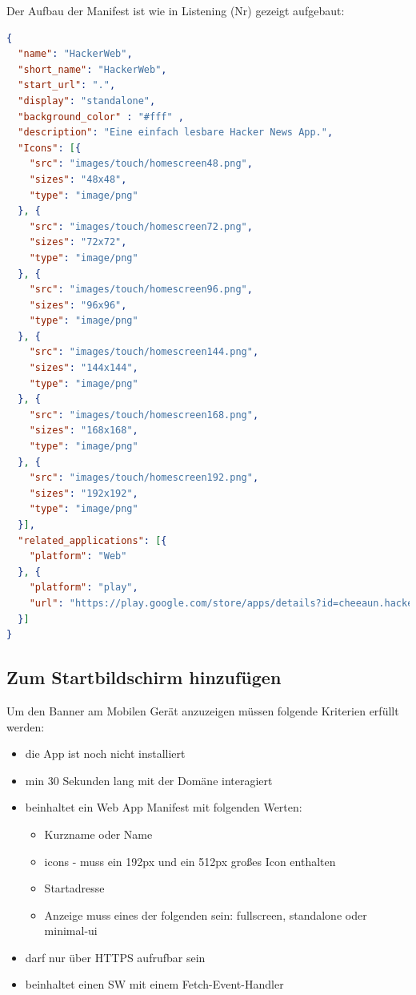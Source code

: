 \newpage
Der Aufbau der Manifest ist wie in Listening (Nr) gezeigt aufgebaut:
\begin{lstlisting}[language=json, firstnumber=1, caption={Manifest in das Projekt implementieren},label=lst:Manifest.json, xleftmargin=50pt]
{
  "name": "HackerWeb",
  "short_name": "HackerWeb",
  "start_url": ".",
  "display": "standalone",
  "background_color" : "#fff" ,
  "description": "Eine einfach lesbare Hacker News App.",
  "Icons": [{
    "src": "images/touch/homescreen48.png",
    "sizes": "48x48",
    "type": "image/png"
  }, {
    "src": "images/touch/homescreen72.png",
    "sizes": "72x72",
    "type": "image/png"
  }, {
    "src": "images/touch/homescreen96.png",
    "sizes": "96x96",
    "type": "image/png"
  }, {
    "src": "images/touch/homescreen144.png",
    "sizes": "144x144",
    "type": "image/png"
  }, {
    "src": "images/touch/homescreen168.png",
    "sizes": "168x168",
    "type": "image/png"
  }, {
    "src": "images/touch/homescreen192.png",
    "sizes": "192x192",
    "type": "image/png"
  }],
  "related_applications": [{
    "platform": "Web"
  }, {
    "platform": "play",
    "url": "https://play.google.com/store/apps/details?id=cheeaun.hackerweb"
  }]
}
\end{lstlisting}\cite{Manifest}

\subsection{Zum Startbildschirm hinzufügen}
Um den Banner am Mobilen Gerät anzuzeigen müssen folgende Kriterien erfüllt werden:


\begin{itemize}
    \item  die App ist noch nicht installiert
	\item  min 30 Sekunden lang mit der Domäne interagiert
	\item  beinhaltet ein Web App Manifest mit folgenden Werten:
		 \begin{itemize}
         \item Kurzname oder Name
         \item icons - muss ein 192px und ein 512px großes Icon enthalten
         \item Startadresse
         \item Anzeige muss eines der folgenden sein: fullscreen, standalone oder minimal-ui
      	\end{itemize}
    \item 	darf nur über HTTPS aufrufbar sein
    \item beinhaltet einen \acl{SW} mit einem Fetch-Event-Handler
\end{itemize}


